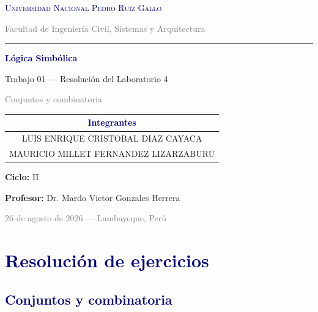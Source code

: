\documentclass[12pt,a4paper]{article}
\begin{document}
\begin{titlepage}
  \centering
  \vspace*{0.4cm}
  {\large\scshape\textcolor{navy}{Universidad Nacional Pedro Ruiz Gallo}\par}
  \vspace{0.15cm}
  {\small\textcolor{gray}{Facultad de Ingeniería Civil, Sistemas y Arquitectura}\par}
  \vspace{0.35cm}
  {\color{navy}\rule{\linewidth}{1.2pt}\par}
  \vspace{0.9cm}
  {\Huge\textbf{\textcolor{navy}{Lógica Simbólica}}\par}
  \vspace{0.35cm}
  {\Large\textcolor{accent}{Trabajo 01 — Resolución del Laboratorio 4}\par}
  \vspace{0.2cm}
  {\large\textcolor{gray}{Conjuntos y combinatoria}\par}
  \vspace{1.1cm}
  \begin{center}
    \begin{tabular}{c}
      \toprule
      \small\textcolor{navy}{\textbf{Integrantes}} \\ \midrule
      \small LUIS ENRIQUE CRISTOBAL DIAZ CAYACA \\
      \small MAURICIO MILLET FERNANDEZ LIZARZABURU \\
      \bottomrule
    \end{tabular}
  \end{center}
  \vspace{0.7cm}
  {\small\textbf{Ciclo:} II\par}
  \vspace{0.15cm}
  {\small\textbf{Profesor:} Dr. Mardo Victor Gonzales Herrera\par}
  \vspace{1.6cm}
  {\small\textcolor{gray}{26 de agosto de 2026 — Lambayeque, Perú}\par}
  \vfill
\end{titlepage}

\section*{\textcolor{navy}{Resolución de ejercicios}}
\subsection*{\textcolor{navy}{Conjuntos y combinatoria}}
\end{document}
